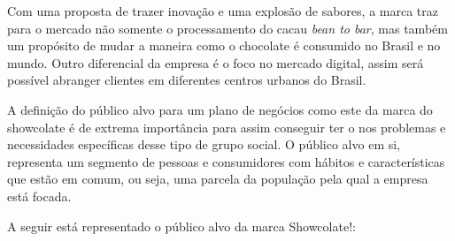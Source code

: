 \documentclass[
	12pt,				%
	openright,			%
	oneside,			%
	a4paper,			%
	english,			%
	french,				%
	spanish,			%
	brazil				%
	]{abntex2}
\begin{document}
Com uma proposta de trazer inovação e uma explosão de sabores, a marca traz para o mercado não somente o processamento do cacau \textit{bean to bar}, mas também um propósito de mudar a maneira como o chocolate é consumido no Brasil e no mundo. Outro diferencial da empresa é o foco no mercado digital, assim será possível abranger clientes em diferentes centros urbanos do Brasil. 

A definição do público alvo para um plano de negócios como este da marca do showcolate é de extrema importância para assim conseguir ter o nos problemas e necessidades específicas desse tipo de grupo social. O público alvo em si, representa um segmento de pessoas e consumidores com hábitos e características que estão em comum, ou seja, uma parcela da população pela qual a empresa está focada.

A seguir está representado o público alvo da marca Showcolate!:
\end{document}
